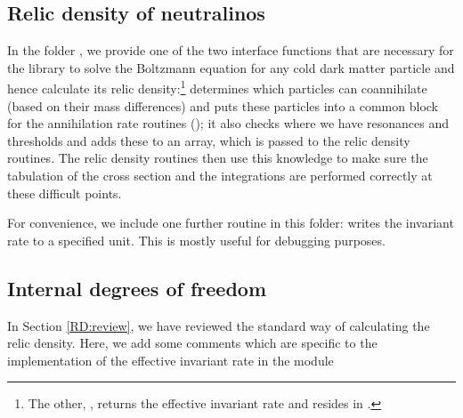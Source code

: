 
\subsection{Relic density of neutralinos}

In the folder , we provide one of the two interface functions
that are necessary for the  library to solve the Boltzmann
equation for any cold dark matter particle and hence calculate its
relic density:\footnote{
The other, , returns the effective invariant rate and resides
in .
}
  determines which particles  can coannihilate (based on
    their mass differences) and puts these particles into a common
    block for the annihilation rate routines (); 
   it also checks where we have resonances and thresholds and adds
    these to an array, which is passed to the relic density
    routines. The relic density routines then use this knowledge to
    make sure the tabulation of the cross section and the integrations
    are performed correctly at these difficult points.

For convenience, we include one further routine in this folder: 
writes the invariant rate to a specified unit. This is mostly useful for debugging
purposes. 


\subsection{Internal degrees of freedom}
\label{sec:dof}

In Section \ref{RD:review}, we have reviewed the standard way of calculating the
relic density. Here, we add some comments which are specific to the 
implementation of the effective invariant rate in the  module

